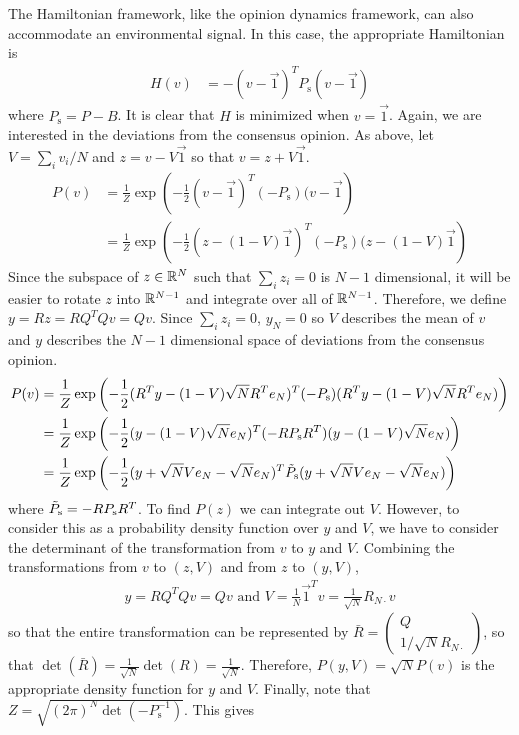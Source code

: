\documentclass{article}
\begin{document}
The Hamiltonian framework, like the opinion dynamics framework, can also accommodate an environmental signal. In this case, the appropriate Hamiltonian is 
\begin{equation}
\begin{array}{lll}
H(v)&=-(v-\vec{1})^TP_\text{s}(v-\vec{1})
\end{array}
\end{equation}
where $P_\text{s}=P-B$.
It is clear that $H$ is minimized when $v=\vec{1}$. 
Again, we are interested in the deviations from the consensus opinion. As above, let $V=\sum_iv_i/N$ and $z=v-V\vec{1}$ so that $v=z+V\vec{1}$. 
\begin{align*}
P(v)&=\frac{1}{Z}\exp\left(-\frac{1}{2}(v-\vec{1})^T(-P_\text{s})(v-\vec{1}\right)
\\&=\frac{1}{Z}\exp\left(-\frac{1}{2}(z-(1-V)\vec{1})^T(-P_\text{s})(z-(1-V)\vec{1}\right)
\end{align*}
Since the subspace of $z\in{\mathbb{R}}^N$ such that $\sum_iz_i=0$ is $N-1$ dimensional, it will be easier to rotate $z$ into ${\mathbb{R}}^{N-1}$ and integrate over all of ${\mathbb{R}}^{N-1}$.  Therefore, we define $y=Rz=RQ^TQv=Qv$. Since $\sum_iz_i=0$, $y_N=0$ so $V$ describes the mean of $v$ and $y$ describes the $N-1$ dimensional space of deviations from the consensus opinion. 
\begin{align*}
P(v)&=\frac{1}{Z}\exp\left(-\frac{1}{2}(R^Ty-(1-V)\sqrt{N}R^Te_N)^T(-P_\text{s})(R^Ty-(1-V)\sqrt{N}R^Te_N)\right)
\\&=\frac{1}{Z}\exp\left(-\frac{1}{2}(y-(1-V)\sqrt{N}e_N)^T(-RP_\text{s}R^T)(y-(1-V)\sqrt{N}e_N)\right)
\\&=\frac{1}{Z}\exp\left(-\frac{1}{2}(y+\sqrt{N}Ve_N-\sqrt{N}e_N)^T\Tilde{P}_\text{s}(y+\sqrt{N}Ve_N-\sqrt{N}e_N)\right)
\end{align*}
where $\Tilde{P}_\text{s}=-RP_\text{s}R^T$. To find $P(z)$ we can integrate out $V$. However, to consider this as a probability density function over $y$ and $V$, we have to consider the determinant of the transformation from $v$ to $y$ and $V$.  Combining the transformations from $v$ to $(z,V)$ and from $z$ to $(y,V)$,
\begin{align*}
y=RQ^TQv=Qv \text{ and } V=\frac{1}{N}\vec{1}^Tv=\frac{1}{\sqrt{N}}R_{N\cdot }v
\end{align*}
so that the entire transformation can be represented by $\bar{R}=\left(\begin{array}{cc}Q \\1/\sqrt{N}R_{N\cdot }\end{array}\right)$, so that $\det(\bar{R})=\frac{1}{\sqrt{N}}\det(R)=\frac{1}{\sqrt{N}}$. Therefore, $P(y,V)=\sqrt{N}P(v)$ is the appropriate density function for $y$ and $V$. Finally, note that $Z=\sqrt{(2\pi)^N\det(-P_\text{s}^{-1})}$. This gives
\end{document}

